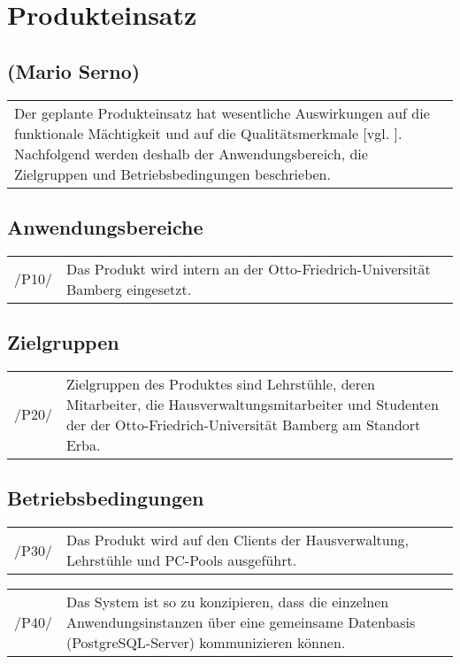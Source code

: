 \section{Produkteinsatz}
\label{sec:Produkteinsatz}

\subsection*{(Mario Serno)}

\begin{tabular}{p{16.5cm}}
Der geplante Produkteinsatz hat wesentliche Auswirkungen auf die funktionale Mächtigkeit und auf die Qualitätsmerkmale [vgl. \cite{balz1996}]. Nachfolgend werden deshalb der Anwendungsbereich, die Zielgruppen und Betriebsbedingungen beschrieben. \\[0.25cm]
\end{tabular}

\subsection{Anwendungsbereiche}
\begin{tabular}{p{1.5cm}p{14.5cm}}	
	 /P10/& Das Produkt wird intern an der Otto-Friedrich-Universität Bamberg eingesetzt. \\[0.25cm]
\end{tabular}


\subsection{Zielgruppen}
\begin{tabular}{p{1.5cm}p{14.5cm}}	
	 /P20/& Zielgruppen des Produktes sind Lehrstühle, deren Mitarbeiter, die Hausverwaltungsmitarbeiter und Studenten der der Otto-Friedrich-Universität Bamberg am Standort Erba. \\[0.25cm]
\end{tabular}


\subsection{Betriebsbedingungen}
\begin{tabular}{p{1.5cm}p{14.5cm}}	
	 /P30/& Das Produkt wird auf den Clients der Hausverwaltung, Lehrstühle und PC-Pools ausgeführt. \\[0.25cm]
\end{tabular}

\begin{tabular}{p{1.5cm}p{14.5cm}}	
	 /P40/& Das System ist so zu konzipieren, dass die einzelnen Anwendungsinstanzen über eine gemeinsame Datenbasis (PostgreSQL-Server) kommunizieren können. \\[0.25cm]
\end{tabular}

